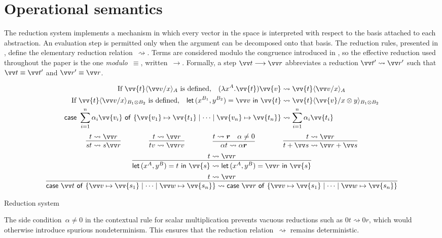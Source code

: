 \documentclass[runningheads,orivec,envcountsame,envcountsect]{llncs}
\newcommand\lra{\longrightarrow}
\newcommand\ansubst[2]{\ensuremath{\langle #1 \rangle_{#2}}}
\def\Pair#1#2{(#1,#2)} %
\def\Lam#1#2#3{\lambda#1^{#2}{.}#3} %
\def\letkeyword{\mathsf{let}}
\def\inkeyword{\mathsf{in}}
\def\LetP#1#2#3#4#5#6{\letkeyword\,\Pair{#1^{#2}}{#3^{#4}}=#5~\inkeyword~#6}
\def\gencase#1#2#3#4#5{\ensuremath{\mathsf{case}~#1~\mathsf{of}~\{#2\mapsto #4 \mid \dotsb \mid #3\mapsto #5\}}}
\def\lraneq{\rightsquigarrow}
\begin{document}
\section{Operational semantics}\label{sec:reduction}

The reduction system implements a mechanism in which every vector in the space
is interpreted with respect to the basis attached to each abstraction. An
evaluation step is permitted only when the argument can be decomposed onto that
basis. The reduction rules, presented in
, define the elementary
reduction relation~$\lraneq$. Terms are considered modulo the congruence
introduced in , so the
effective reduction used throughout the paper is the one
\emph{modulo~$\equiv$}, written~$\lra$.  Formally, a step $\vv t\lra\vv r$
abbreviates a reduction $\vv t'\lraneq\vv r'$ such that $\vv t\equiv\vv t'$
and $\vv r'\equiv\vv r$.

\begin{table}[t]
  \begin{align*}
    \text{If }\vv{t}\ansubst{\vv v/x}{A}\text{ is defined,}\quad
    (\Lam{x}{A}{\vv{t}})\vv{v}
    &\lraneq \vv{t}\ansubst{\vv v/x}{A}\\
    \text{If }\vv{t}\ansubst{\vv v/x}{B_1\otimes B_2}\text{ is defined,}\quad
    \LetP{x}{B_1}{y}{B_2}{\vv v}{\vv{t}}
    &\lraneq \vv{t}\ansubst{\vv{v}/x\otimes y}{B_1\otimes B_2}\\
    \gencase{\sum_{i=1}^{n}\alpha_i \vv{v_i}}{\vv{v_1}}{\vv{v_n}}{\vv{t_1}}{\vv{t_n}}
    &\lraneq \sum_{i=1}^{n}\alpha_i \vv{t_i}
  \end{align*}
  \[
    \begin{array}{c}
      \infer{st\lraneq s\vv r}{t\lraneq \vv r}
      \qquad\qquad
      \infer{tv\lraneq \vv rv}{t\lraneq\vv r}
      \qquad\qquad
      \infer{\alpha t\lraneq \alpha \vec r}{t\lraneq\vec r & \alpha\neq 0}
      \qquad\qquad
      \infer{t+\vv s\lraneq\vv r+\vv s}{t\lraneq\vv r}
      \\[5pt]
      \infer{\LetP{x}{A}{y}{B}{t}{\vv{s}}\lraneq
      \LetP{x}{A}{y}{B}{\vv r}{\vv{s}}}{t\lraneq \vv r} 
      \\[5pt]
      \infer{\gencase{\vv t}{\vv v}{\vv w}{\vv{s_1}}{\vv{s_n}}\lraneq
      \gencase{\vv r}{\vv v}{\vv w}{\vv{s_1}}{\vv{s_n}}}{t\lraneq \vv r}
    \end{array}
  \]
  \caption{Reduction system}
  \label{tab:Reduction}
\end{table}

The side condition~$\alpha\neq0$ in the contextual rule for scalar
multiplication prevents vacuous reductions such as $0t\lraneq 0r$, which would
otherwise introduce spurious nondeterminism. This ensures that the reduction
relation~$\lraneq$ remains deterministic.
\end{document}
